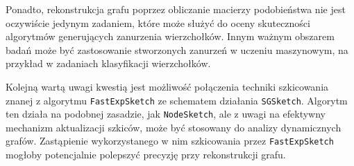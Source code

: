     Ponadto, rekonstrukcja grafu poprzez obliczanie macierzy podobieństwa nie jest oczywiście jedynym zadaniem, które może służyć do oceny skuteczności algorytmów generujących zanurzenia wierzchołków. Innym ważnym obszarem badań może być zastosowanie stworzonych zanurzeń w uczeniu maszynowym, na przykład w zadaniach klasyfikacji wierzchołków. 

    Kolejną wartą uwagi kwestią jest możliwość połączenia techniki szkicowania znanej z algorytmu \texttt{FastExpSketch} ze schematem działania \texttt{SGSketch}. Algorytm ten działa na podobnej zasadzie, jak \texttt{NodeSketch}, ale z uwagi na efektywny mechanizm aktualizacji szkiców, może być stosowany do analizy dynamicznych grafów. Zastąpienie wykorzystanego w nim szkicowania przez \texttt{FastExpSketch} mogłoby potencjalnie polepszyć precyzję przy rekonstrukcji grafu.